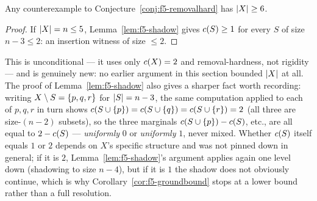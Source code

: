 \begin{corollary}
\label{cor:f5-groundbound}
Any counterexample to Conjecture~\ref{conj:f5-removalhard} has $\left\lvert X\right\rvert \ge 6$.
\end{corollary}

\begin{proof}
If $\left\lvert X\right\rvert = n \le 5$, Lemma~\ref{lem:f5-shadow} gives $c(S) \ge 1$ for
every $S$ of size $n - 3 \le 2$: an insertion witness of size $\le 2$.
\end{proof}

This is unconditional --- it uses only $c(X) = 2$ and removal-hardness,
not rigidity --- and is genuinely new: no earlier argument in this section
bounded $\left\lvert X\right\rvert$ at all. The proof of Lemma~\ref{lem:f5-shadow} also gives a
sharper fact worth recording: writing $X \setminus S = \left\{p,q,r\right\}$ for
$\left\lvert S\right\rvert = n-3$, the same computation applied to each of $p,q,r$ in turn shows
$c(S \cup \left\{p\right\}) = c(S \cup \left\{q\right\}) = c(S \cup \left\{r\right\}) = 2$
(all three are size-$(n-2)$ subsets), so the three marginals
$c(S\cup\left\{p\right\})-c(S)$, etc., are all equal to $2 - c(S)$ ---
\emph{uniformly} $0$ or \emph{uniformly} $1$, never mixed. Whether
$c(S)$ itself equals $1$ or $2$ depends on $X$'s specific structure and
was not pinned down in general; if it is $2$, Lemma~\ref{lem:f5-shadow}'s
argument applies again one level down (shadowing to size $n-4$), but if it is
$1$ the shadow does not obviously continue, which is why
Corollary~\ref{cor:f5-groundbound} stops at a lower bound rather than a full
resolution.

